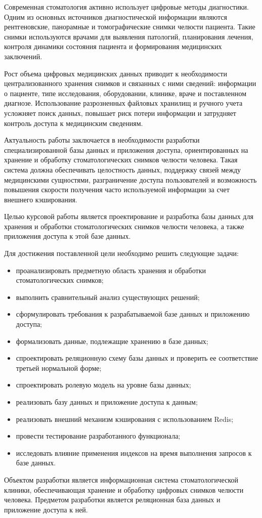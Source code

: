 
Современная стоматология активно использует цифровые методы диагностики. Одним из основных источников диагностической информации являются рентгеновские, панорамные и томографические снимки челюсти пациента. Такие снимки используются врачами для выявления патологий, планирования лечения, контроля динамики состояния пациента и формирования медицинских заключений.

Рост объема цифровых медицинских данных приводит к необходимости централизованного хранения снимков и связанных с ними сведений: информации о пациенте, типе исследования, оборудовании, клинике, враче и поставленном диагнозе. Использование разрозненных файловых хранилищ и ручного учета усложняет поиск данных, повышает риск потери информации и затрудняет контроль доступа к медицинским сведениям.

Актуальность работы заключается в необходимости разработки специализированной базы данных и приложения доступа, ориентированных на хранение и обработку стоматологических снимков челюсти человека. Такая система должна обеспечивать целостность данных, поддержку связей между медицинскими сущностями, разграничение доступа пользователей и возможность повышения скорости получения часто используемой информации за счет внешнего кэширования.

Целью курсовой работы является проектирование и разработка базы данных для хранения и обработки стоматологических снимков челюсти человека, а также приложения доступа к этой базе данных.

Для достижения поставленной цели необходимо решить следующие задачи:
\begin{itemize}
	\item проанализировать предметную область хранения и обработки стоматологических снимков;
	\item выполнить сравнительный анализ существующих решений;
	\item сформулировать требования к разрабатываемой базе данных и приложению доступа;
	\item формализовать данные, подлежащие хранению в базе данных;
	\item спроектировать реляционную схему базы данных и проверить ее соответствие третьей нормальной форме;
	\item спроектировать ролевую модель на уровне базы данных;
	\item реализовать базу данных и приложение доступа к данным;
	\item реализовать внешний механизм кэширования с использованием Redis;
	\item провести тестирование разработанного функционала;
	\item исследовать влияние применения индексов на время выполнения запросов к базе данных.
\end{itemize}

Объектом разработки является информационная система стоматологической клиники, обеспечивающая хранение и обработку цифровых снимков челюсти человека. Предметом разработки является реляционная база данных и приложение доступа к ней.

\clearpage
